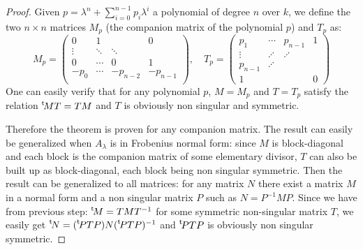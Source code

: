 \documentclass{article}%
\def\transpose#1{{\vphantom{#1}}^{\mathrm{t}}\!#1}
\begin{document}
{\begin{proof}%
Given $p=\lambda^n+\sum_{i=0}^{n-1}{p_i\lambda^i}$ a polynomial of degree $n$ over $k$, we define the two 
$n\times n$ matrices $M_p$ (the companion matrix of the polynomial $p$) and $T_p$ as:
\begin{equation}
\label{eq:companion}
M_p = \begin{pmatrix}
0 & 1 & & 0\\
\vdots & \ddots & \ddots & \\
0 & \cdots & 0 & 1 \\
-p_0 & \cdots & -p_{n-2} & -p_{n-1}\\
%
\end{pmatrix}
, \quad T_p = \begin{pmatrix}
	p_1 & \cdots & p_{n-1} & 1 \\
	\vdots	& \iddots & \iddots & \\
	p_{n-1} & \iddots & & \\
	1 & & & 0
\end{pmatrix}
\end{equation}
One can easily verify that for any polynomial $p$, $M=M_p$ and $T=T_p$
satisfy the relation $\transpose{M}T = TM$ and $T$ is obviously non singular and symmetric.

Therefore the theorem is proven for any companion matrix. The result can
easily be generalized when $A_\lambda$ is in Frobenius normal form: since $M$ is block-diagonal and each block is the companion matrix of some elementary divisor, $T$ can also be built up as block-diagonal, each block being non singular symmetric. Then the result can be generalized to all matrices: for any matrix $N$ there exist a matrix $M$ in a normal form and a non singular matrix $P$ such as $N=P^{-1}MP$.  Since we have from previous step: $\transpose{M} = TMT^{-1}$ for some symmetric non-singular matrix $T$, we easily get $\transpose{N}=(\transpose{P}TP)N(\transpose{P}TP)^{-1}$ and $\transpose{P}TP$ is obviously non singular symmetric.
\end{proof}
% 
% 
}
\fi
\end{document}

